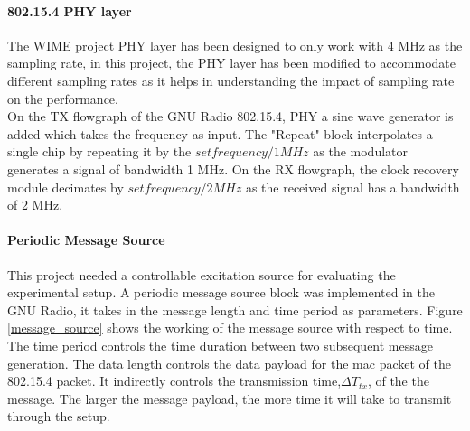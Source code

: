 \paragraph{802.15.4 \ac{PHY} layer}

The WIME project \ac{PHY} layer has been designed to only work with 4 MHz as the sampling rate, in this project, the \ac{PHY} layer has been modified to accommodate different sampling rates as it helps in understanding the impact of sampling rate on the performance.\\

On the TX flowgraph of the GNU Radio 802.15.4, \ac{PHY} a sine wave generator is added which takes the frequency as input.
The "Repeat" block interpolates a single chip by repeating it by the $set frequency/1 MHz$ as the modulator generates a signal of bandwidth 1 MHz.
On the RX flowgraph, the clock recovery module decimates by $set frequency/2 MHz$ as the received signal has a bandwidth of 2 MHz.

\paragraph{Periodic Message Source} \label{Periodic Message Source}
This project needed a controllable excitation source for evaluating the experimental setup.
A periodic message source block was implemented in the GNU Radio, it takes in the message length and time period as parameters.
Figure \ref{message_source} shows the working of the message source with respect to time.
The time period controls the time duration between two subsequent message generation.
The data length controls the data payload for the \ac{mac} packet of the 802.15.4 packet.
It indirectly controls the transmission time,$\Delta T_{tx}$, of the the message.
The larger the message payload, the more time it will take to transmit through the setup. 
\\



